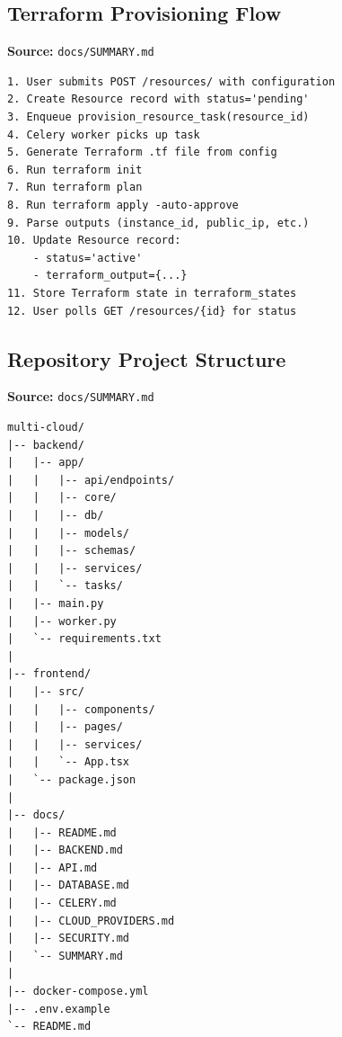 \subsection{Terraform Provisioning Flow}
\textbf{Source:} \texttt{docs/SUMMARY.md}
\begin{lstlisting}[numbers=none,basicstyle=\ttfamily\tiny,caption={Terraform Provisioning Flow Adapted from docs/SUMMARY.md}]
1. User submits POST /resources/ with configuration
2. Create Resource record with status='pending'
3. Enqueue provision_resource_task(resource_id)
4. Celery worker picks up task
5. Generate Terraform .tf file from config
6. Run terraform init
7. Run terraform plan
8. Run terraform apply -auto-approve
9. Parse outputs (instance_id, public_ip, etc.)
10. Update Resource record:
    - status='active'
    - terraform_output={...}
11. Store Terraform state in terraform_states
12. User polls GET /resources/{id} for status
\end{lstlisting}

\subsection{Repository Project Structure}
\textbf{Source:} \texttt{docs/SUMMARY.md}
\begin{lstlisting}[numbers=none,basicstyle=\ttfamily\tiny,caption={Repository Project Structure Adapted from docs/SUMMARY.md}]
multi-cloud/
|-- backend/
|   |-- app/
|   |   |-- api/endpoints/
|   |   |-- core/
|   |   |-- db/
|   |   |-- models/
|   |   |-- schemas/
|   |   |-- services/
|   |   `-- tasks/
|   |-- main.py
|   |-- worker.py
|   `-- requirements.txt
|
|-- frontend/
|   |-- src/
|   |   |-- components/
|   |   |-- pages/
|   |   |-- services/
|   |   `-- App.tsx
|   `-- package.json
|
|-- docs/
|   |-- README.md
|   |-- BACKEND.md
|   |-- API.md
|   |-- DATABASE.md
|   |-- CELERY.md
|   |-- CLOUD_PROVIDERS.md
|   |-- SECURITY.md
|   `-- SUMMARY.md
|
|-- docker-compose.yml
|-- .env.example
`-- README.md
\end{lstlisting}

